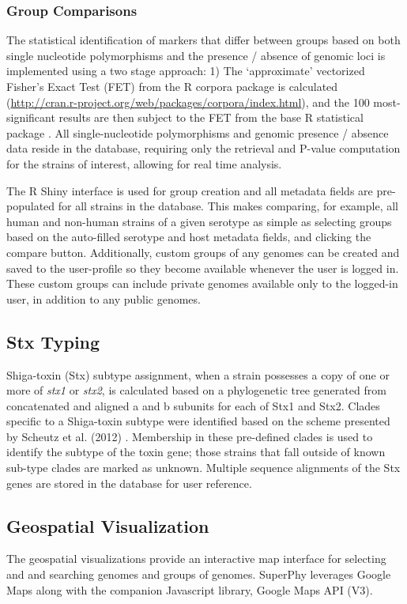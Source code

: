 \documentclass[doublespacing, linenumbers]{bmcart}
\begin{document}
\subsubsection{Group Comparisons}
The statistical identification of markers that differ between groups based on both single nucleotide polymorphisms and the presence / absence of genomic loci is implemented using a two stage approach: 1) The `approximate' vectorized Fisher’s Exact Test (FET) from the R corpora package is calculated (\url{http://cran.r-project.org/web/packages/corpora/index.html}), and the 100 most-significant results are then subject to the FET from the base R statistical package \cite{r_foundation_for_statistical_computing_r:_2005}. All single-nucleotide polymorphisms and genomic presence / absence data reside in the database, requiring only the retrieval and P-value computation for the strains of interest, allowing for real time analysis.

The R Shiny interface is used for group creation and all metadata fields are pre-populated for all strains in the database. This makes comparing, for example, all human and non-human strains of a given serotype as simple as selecting groups based on the auto-filled serotype and host metadata fields, and clicking the compare button. Additionally, custom groups of any genomes can be created and saved to the user-profile so they become available whenever the user is logged in. These custom groups can include private genomes available only to the logged-in user, in addition to any public genomes.

\subsection{Stx Typing}
Shiga-toxin (Stx) subtype assignment, when a strain possesses a copy of one or more of \textit{stx1} or \textit{stx2}, is calculated based on a phylogenetic tree generated from concatenated and aligned a and b subunits for each of Stx1 and Stx2. Clades specific to a Shiga-toxin subtype were identified based on the scheme presented by Scheutz et al. (2012) \cite{scheutz_multicenter_2012}. Membership in these pre-defined clades is used to identify the subtype of the toxin gene; those strains that fall outside of known sub-type clades are marked as unknown. Multiple sequence alignments of the Stx genes are stored in the database for user reference.

\subsection{Geospatial Visualization}
The geospatial visualizations provide an interactive map interface for selecting and and searching genomes and groups of genomes. SuperPhy leverages Google Maps along with the companion Javascript library, Google Maps API (V3).
\end{document}
